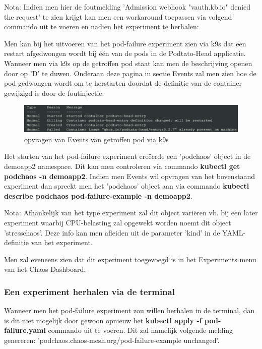 Nota: Indien men hier de foutmelding 'Admission webhook "vauth.kb.io" denied the request' te zien krijgt kan men een workaround toepassen via volgend commando uit te voeren en nadien het experiment te herhalen: \autocite{Keao2021} 
  
Men kan bij het uitvoeren van het pod-failure experiment zien via k9s dat een restart afgedwongen wordt bij één van de pods in de Podtato-Head applicatie. Wanneer men via k9s op de getroffen pod staat kan men de beschrijving openen door op 'D' te duwen. Onderaan deze pagina in sectie Events zal men zien hoe de pod gedwongen wordt om te herstarten doordat de definitie van de container gewijzigd is door de foutinjectie.

\begin{figure}[h]
    \centering
    \includegraphics[scale=.7]{img/k9s-pod-described.png}
    \caption{opvragen van Events van getroffen pod via k9s}
\end{figure}

Het starten van het pod-failure experiment creëerde een 'podchaos' object in de demoapp2 namespace. Dit kan men controleren via commando {\bf kubectl get podchaos -n demoapp2}. Indien men Events wil opvragen van het bovenstaand experiment dan spreekt men het 'podchaos' object aan via commando {\bf kubectl describe podchaos pod-failure-example -n demoapp2}.

Nota: Afhankelijk van het type experiment zal dit object variëren vb. bij een later experiment waarbij CPU-belasting zal opgewekt worden noemt dit object 'stresschaos'. Deze info kan men afleiden uit de parameter 'kind' in de YAML-definitie van het experiment. 

Men zal eveneens zien dat dit experiment toegevoegd is in het Experiments menu van het Chaos Dashboard.

\subsubsection{Een experiment herhalen via de terminal}

Wanneer men het pod-failure experiment zou willen herhalen in de terminal, dan is dit niet mogelijk door gewoon opnieuw het {\bf kubectl apply -f pod-failure.yaml} commando uit te voeren. Dit zal namelijk volgende melding genereren: 'podchaos.chaos-mesh.org/pod-failure-example unchanged'. 

